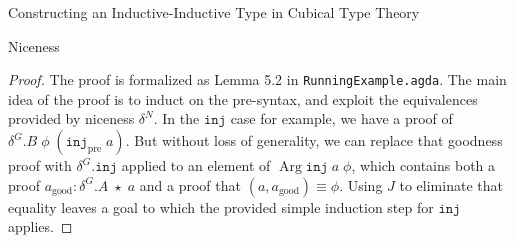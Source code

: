 \documentclass[runningheads]{llncs}
\newcommand{\erase}[1]{{}}
\DeclareMathOperator{\USet}{Set}
\DeclareMathOperator{\Arg}{Arg}
\newcommand{\pre}[1]{{#1}_\text{pre}}
\newcommand{\good}[1]{{#1}_\text{good}}
\newcommand{\Id}[2]{{#1}\equiv{#2}}
\newcommand{\IdA}[3]{{#1}\equiv_{#3}{#2}}
\newcommand{\join}{\texttt{join}}
\newcommand{\inj}{\texttt{inj}}
\newcommand{\refl}{\texttt{refl}}
\begin{document}
\begin{section}{Constructing an Inductive-Inductive Type in Cubical Type Theory}
\begin{subsection}{Niceness}
\begin{proof}
The proof is formalized as Lemma 5.2 in \texttt{RunningExample.agda}. The main idea of the proof is to induct on the pre-syntax, and exploit the equivalences provided by niceness $\delta^N$. In the $\inj$ case for example, we have a proof of $\delta^G.B\;\phi\;(\pre{\inj}\;a)$. But without loss of generality, we can replace that goodness proof with $\delta^G.\inj$ applied to an element of $\Arg\inj\;a\;\phi$, which contains both a proof $\good{a} : \delta^G.A\;\star\;a$ and a proof that $\Id{(a, \good{a})}{\phi}$. Using $J$ to eliminate that equality leaves a goal to which the provided simple induction step for $\inj$ applies.

\erase{
Assume motives $(PA, PB)$ and methods $(P\eta, P\join, P\inj)$
\begin{align*}
PA :&\; A \to \USet,\\
PB :&\; (a : A) \to B\;a\to \USet,\\
P\eta :&\; (x : X) \to PA\;(\eta\;x),\\
P\join :&\; (a : A) \to PA\;a\to (b : B\;a) \to PB\;a\;b \to PA\;(\join\;a\;b),\\
P\inj :&\; (a : A) \to PA\;a\to PB\;a\;(\inj\;a).
\end{align*}
We need to produce eliminators $(EA, EB)$ satisfying equalities $(E\eta, E\join, E\inj)$.
\begin{align*}
EA :&\; (a : A) \to PA\;a,\\
EB :&\; (a : A) \to (b : B\;a) \to PB\;a\;b,\\
E\eta :&\; (x : X) \to \IdA{EA\;(\eta\;x)}{P\eta\;x}{PA\;(\eta\;x)},\\
E\join :&\; (a : A) \to (b : B\;a) \to \IdA{EA\;(\join\;a\;b)}{P\join\;a\;(EA\;a)\;b\;(EB\;a\;b)}{PA\;(\join\;a\;b)},\\
E\inj :&\; (a : A) \to \IdA{EB\;a\;(\inj\;a)}{P\inj\;a\;(EA\;a)}{PB\;a\;(\inj\;a)}.
\end{align*}
Keep in mind the definitions in Figure \ref{example-goodness-algebra-def}.
Since we have defined \[A = (a : \pre{A}) \times \delta^G.A\;\star\;a,\qquad B\;\phi = (b : \pre{B})\times\delta^G\;\phi\;b,\] up to currying it is sufficient to define \[EA : (\pre{a} : \pre{A}) \to (\good{a} : \delta^G.A\;\star\;\pre{a}) \to PA\;(\pre{a}, \good{a}),\]\[EB : (\pre{b} : \pre{B}) \to (\phi : A) \to (\good{b} : \delta^G.B\;\phi\;(\pre{b}, \good{b})) \to PB\;\phi\;(\pre{b}, \good{b}),\] and we will do so by induction on the pre-syntax.
\begin{itemize}
\item When $\pre{a} = \pre{\eta}\;x$, we can let $\phi = \star$ and apply Lemma \ref{equiv-pullback} with $\delta^N.\eta\;x\;\phi$ to only consider \[\good{a} = \delta^G.\eta\;x\;\phi\;(\star, p),\quad\text{ for some }\quad(\star, p) : \Arg\eta\;x\;\phi = \top \times \Id{\star}{\phi}.\] Applying $J$, we can without loss of generality only consider $(\phi, p) = (\star, \refl)$, and we have to prove \[PA\;(\pre{\eta}\;x, \delta^G.\eta\;x\;\star\;(\star, \refl)) = PA\;(\eta\;x),\] which we can do with $P\eta\;x$.

\end{itemize}}
\end{proof}
\end{subsection}
\end{section}
\end{document}
